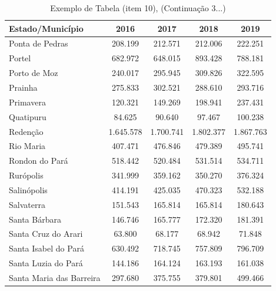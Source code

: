 \newpage
\begin{table}[H]
    \centering
    {
    \caption{Exemplo de Tabela (item 10),  (Continuação 3...)
    \label{item 10 regras4}} 
    \vspace{0.1cm}
\begin{tabular}{l|c|c|c|c}
  \hline\hline
  Estado/Município          &    2016     &    2017    &  2018     &  2019         \\
  \hline\hline
   Ponta de Pedras          &  208.199    & 212.571    & 212.006   & 222.251       \\
   Portel                   &  682.972    & 648.015    & 893.428   &  788.181       \\
   Porto de Moz             &  240.017    & 295.945    & 309.826   & 322.595        \\
   Prainha                  &  275.833    & 302.521    & 288.610   & 293.716        \\ 
   Primavera                &  120.321    & 149.269    & 198.941   & 237.431        \\
   Quatipuru                &  84.625     & 90.640     & 97.467    & 100.238        \\
   Redenção                 &  1.645.578  & 1.700.741  & 1.802.377 &  1.867.763     \\
   Rio Maria                &  407.471    & 476.846    & 479.389   &  495.741       \\
   Rondon do Pará           &  518.442    & 520.484    & 531.514   &  534.711       \\
   Rurópolis                &  341.999    & 359.162    & 350.270   &  376.324       \\
   Salinópolis              &  414.191    & 425.035    & 470.323   &  532.188        \\
   Salvaterra               &  151.543    & 165.814    & 165.814   & 180.643         \\
   Santa Bárbara            &  146.746    & 165.777    & 172.320   & 181.391         \\
   Santa Cruz do Arari      &  63.800     & 68.177     & 68.942    & 71.848          \\
   Santa Isabel do Pará     &  630.492    & 718.745    & 757.809   & 796.709         \\
   Santa Luzia do Pará      &  144.186    & 164.124    & 163.193   & 161.038         \\
   Santa Maria das Barreira & 297.680     & 375.755    & 379.801   & 499.466         \\

\end{tabular}}
\end{table}
